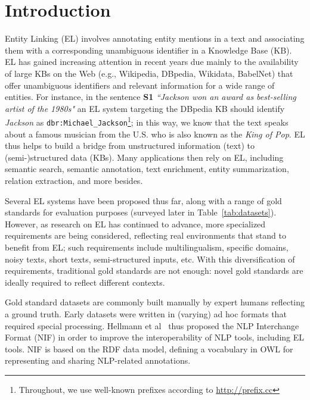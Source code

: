 \documentclass[sigconf]{acmart}
\begin{document}
\section{Introduction}
Entity Linking (EL) involves annotating entity mentions in a text and associating them with a corresponding unambiguous identifier in a Knowledge Base (KB). EL has gained increasing attention in recent years due mainly to the availability of large KBs on the Web (e.g., Wikipedia, DBpedia, Wikidata, BabelNet) that offer unambiguous identifiers and relevant information for a wide range of entities. For instance, in the sentence \textbf{S1} \textit{``Jackson won an award as best-selling artist of the 1980s"} an EL system targeting the DBpedia KB should identify \textit{Jackson} as \texttt{dbr:Michael\_Jackson}\footnote{Throughout, we use well-known prefixes according to \url{http://prefix.cc}}; in this way, we know that the text speaks about a famous musician from the U.S. who is also known as the \textit{King of Pop}. EL thus helps to build a bridge from unstructured information (text) to (semi-)structured data (KBs).  Many applications then rely on EL, including semantic search, semantic annotation, text enrichment, entity summarization, relation extraction, and more besides.

Several EL systems have been proposed thus far, along with a range of gold standards for evaluation purposes (surveyed later in Table~\ref{tab:datasets}). However, as research on EL has continued to advance, more specialized requirements are being considered, reflecting real environments that stand to benefit from EL; such requirements include multilingualism, specific domains, noisy texts, short texts, semi-structured inputs, etc. %
With this diversification of requirements, traditional gold standards are not enough: novel gold standards are ideally required to reflect different contexts.

Gold standard datasets are commonly built manually by expert humans reflecting a ground truth. Early datasets were written in (varying) ad hoc formats that required special processing. Hellmann et al~\cite{NIFpaper} thus proposed the NLP Interchange Format (NIF) in order to improve the interoperability of NLP tools, including EL tools. NIF is based on the RDF data model, defining a vocabulary in OWL for representing and sharing NLP-related annotations. %
\end{document}
